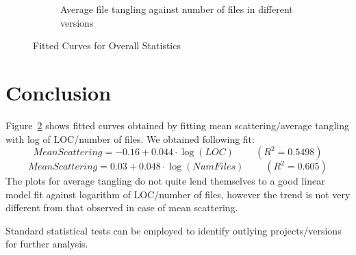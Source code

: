 \documentclass[12pt]{article}
\begin{document}
\begin{figure}
\begin{subfigure}[b]{0.5\textwidth}
                \caption{Average file tangling against number of files in different versions}
                \label{overall-tangle2}
        \end{subfigure}
        \caption{Fitted Curves for Overall Statistics}\label{fig:overall2}
\end{figure}


\section{Conclusion}
Figure~\ref{fig:overall2} shows fitted curves obtained by fitting mean scattering/average tangling with log of LOC/number of files. We obtained following fit:
\[ MeanScattering = -0.16 + 0.044\cdot\log{(LOC)}\;\;\;\;\;\;\;\;{(R^2 = 0.5498)}\]
\[ MeanScattering = 0.03 + 0.048\cdot\log{(NumFiles)}\;\;\;\;\;\;\;\;(R^2 = 0.605)\]
The plots for average tangling do not quite lend themselves to a good linear model fit against logarithm of LOC/number of files, however the trend is not very different from that observed in case of mean scattering.

Standard statistical tests can be employed to identify outlying projects/versions for further analysis.

\newpage
{}


\newpage
\end{document}
